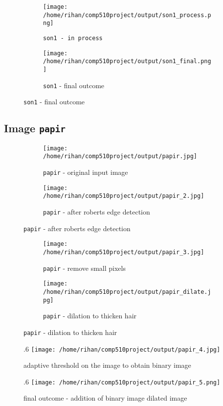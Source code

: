 \begin{figure}[h!]
  \begin{subfigure}{.6\textwidth}
    \centering
    \texttt{[image: /home/rihan/comp510project/output/son1\_process.png]}
    \caption{\texttt{son1 - in process}}
  \end{subfigure}%
  \begin{subfigure}{.6\textwidth}
    \centering
    \texttt{[image: /home/rihan/comp510project/output/son1\_final.png]}
    \caption{\texttt{son1} - final outcome}
  \end{subfigure}
\end{figure}

\pagebreak

\subsection{Image \texttt{papir}}

\begin{figure}[h!]
  \begin{subfigure}{.5\textwidth}
    \centering
    \texttt{[image: /home/rihan/comp510project/output/papir.jpg]}
    \caption{\texttt{papir} - original input image}
  \end{subfigure}%
  \begin{subfigure}{.6\textwidth}
    \centering
    \texttt{[image: /home/rihan/comp510project/output/papir\_2.jpg]}
    \caption{\texttt{papir} - after roberts edge detection}
  \end{subfigure}
\end{figure}

\begin{figure}[h!]
  \begin{subfigure}{.6\textwidth}
    \centering
    \texttt{[image: /home/rihan/comp510project/output/papir\_3.jpg]}
    \caption{\texttt{papir} - remove small pixels}
  \end{subfigure}%
  \begin{subfigure}{.6\textwidth}
    \centering
    \texttt{[image: /home/rihan/comp510project/output/papir\_dilate.jpg]}
    \caption{\texttt{papir} - dilation to thicken hair}
  \end{subfigure}
\end{figure}

\begin{figure}[h!]{.6\textwidth}
  \centering
  \texttt{[image: /home/rihan/comp510project/output/papir\_4.jpg]}
  \caption{adaptive threshold on the image to obtain binary image}
\end{figure}
\begin{figure}[h!]{.6\textwidth}
  \centering
  \texttt{[image: /home/rihan/comp510project/output/papir\_5.png]}
  \caption{final outcome - addition of binary image \+ dilated image}
\end{figure}

